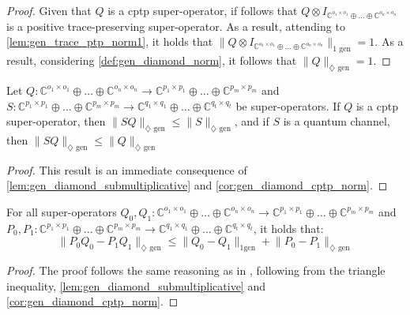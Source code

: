\begin{proof}
  Given that $Q$ is a \acrshort{cptp} super-operator, if follows that $ Q \otimes I_{\mathbb{C}^{o_1 \times o_1} \oplus \ldots \oplus \mathbb{C}^{o_n \times o_n}}$ is a positive trace-preserving super-operator. As a result, attending to \autoref{lem:gen_trace_ptp_norm1}, it holds that $\lVert Q \otimes I_{\mathbb{C}^{o_1 \times o_1} \oplus \ldots \oplus \mathbb{C}^{o_n \times o_n}} \rVert_{1 \text{ gen}} = 1$. As a result, considering  \autoref{def:gen_diamond_norm}, it follows that $\lVert Q \rVert_{\diamondsuit \text{ gen}} = 1$.
\end{proof}

\begin{corollary}
  Let  $Q: \mathbb{C}^{o_1 \times o_1} \oplus \ldots \oplus \mathbb{C}^{o_n \times o_n}  \rightarrow \mathbb{C}^{p_1 \times p_1} \oplus \ldots \oplus  \mathbb{C}^{p_m \times p_m}$ and $S: \mathbb{C}^{p_1 \times p_1} \oplus \ldots \oplus \mathbb{C}^{p_m \times p_m}  \rightarrow \mathbb{C}^{q_1 \times q_1} \oplus \ldots \oplus \mathbb{C}^{q_t \times q_t}$ be super-operators. If $Q$ is a \acrshort{cptp} super-operator, then $\lVert S  Q \rVert_{\diamondsuit \text{ gen}} \leq \lVert S \rVert_{\diamondsuit \text{ gen}}$, and if $S$ is a quantum channel, then $\lVert S  Q \rVert_{\diamondsuit \text{ gen}} \leq \lVert Q \rVert_{\diamondsuit \text{ gen}}$
\end{corollary}

\begin{proof}
  This result is an immediate consequence of \autoref{lem:gen_diamond_submultiplicative} and \autoref{cor:gen_diamond_cptp_norm}. 
\end{proof}

\begin{proposition} \label{prop:gen_diamond_subtraction}
  For all super-operators $Q_0, Q_1:\mathbb{C}^{o_1 \times o_1} \oplus \ldots \oplus \mathbb{C}^{o_n \times o_n}  \rightarrow \mathbb{C}^{p_1 \times p_1} \oplus \ldots \oplus  \mathbb{C}^{p_m \times p_m}$ and $P_0, P_1:\mathbb{C}^{p_1 \times p_1} \oplus \ldots \oplus  \mathbb{C}^{p_m \times p_m} \rightarrow \mathbb{C}^{q_1 \times q_1} \oplus \ldots \oplus  \mathbb{C}^{q_t \times q_t}$, it holds that:
  \begin{equation}
    \lVert P_0 Q_0 - P_1Q_1 \rVert_{\diamondsuit \text{ gen}}  \leq  \lVert Q_0- Q_1 \rVert_{1 \text{gen}} + \lVert P_0 - P_1 \rVert_{\diamondsuit \text{ gen}}
  \end{equation}
\end{proposition}
\begin{proof}
  The proof follows the same reasoning as in \cite[Proof of Theorem 3.41]{watrous2018theory}, following from the triangle inequality, \autoref{lem:gen_diamond_submultiplicative} and \autoref{cor:gen_diamond_cptp_norm}. 
\end{proof}

